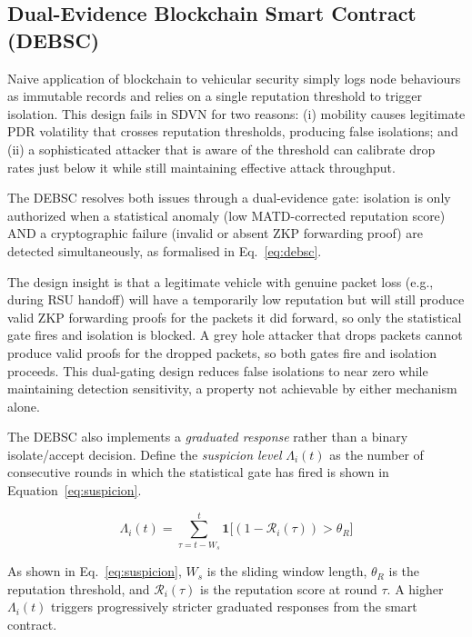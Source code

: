 \documentclass[12pt, a4paper]{report}
\begin{document}
\subsection{Dual-Evidence Blockchain Smart Contract (DEBSC)}

Naive application of blockchain to vehicular security simply logs node
behaviours as immutable records and relies on a single reputation
threshold to trigger isolation. This design fails in SDVN for two
reasons: (i) mobility causes legitimate PDR volatility that crosses
reputation thresholds, producing false isolations; and (ii) a
sophisticated attacker that is aware of the threshold can calibrate
drop rates just below it while still maintaining effective attack
throughput.

The DEBSC resolves both issues through a dual-evidence gate: isolation
is only authorized when a statistical anomaly (low MATD-corrected
reputation score) AND a cryptographic failure (invalid or absent ZKP
forwarding proof) are detected simultaneously, as formalised in
Eq.~\eqref{eq:debsc}.

The design insight is that a legitimate vehicle with genuine packet loss
(e.g., during RSU handoff) will have a temporarily low reputation but
will still produce valid ZKP forwarding proofs for the packets it did
forward, so only the statistical gate fires and isolation is blocked.
A grey hole attacker that drops packets cannot produce valid proofs for
the dropped packets, so both gates fire and isolation proceeds. This
dual-gating design reduces false isolations to near zero while maintaining
detection sensitivity, a property not achievable by either mechanism alone.

The DEBSC also implements a \emph{graduated response} rather than a
binary isolate/accept decision. Define the \emph{suspicion level}
$\Lambda_i(t)$ as the number of consecutive rounds in which the statistical
gate has fired is shown in Equation~\eqref{eq:suspicion}.

\begin{equation}
\label{eq:suspicion}
\Lambda_i(t) = \sum_{\tau=t-W_s}^{t}
\mathbf{1}\bigl[(1-\mathcal{R}_i(\tau)) > \theta_R\bigr]
\end{equation}

As shown in Eq.~\eqref{eq:suspicion}, $W_s$ is the sliding window 
length, $\theta_R$ is the reputation threshold, and 
$\mathcal{R}_i(\tau)$ is the reputation score at round $\tau$. A 
higher $\Lambda_i(t)$ triggers progressively stricter graduated 
responses from the smart contract.
\end{document}
